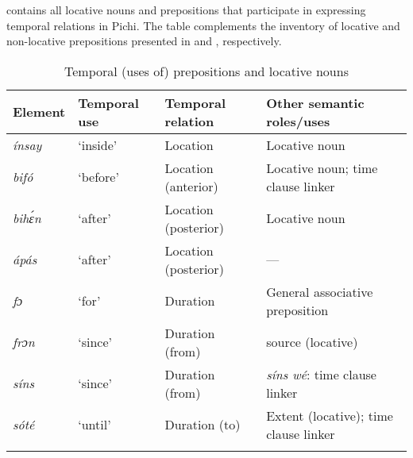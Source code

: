  contains all locative nouns and prepositions that participate in expressing temporal relations in Pichi. The table complements the inventory of locative and non-locative prepositions presented in  and , respectively.

\begin{table}
\caption{Temporal (uses of) prepositions and locative nouns}
\label{tab:key:8.7}

\begin{tabularx}{\textwidth}{lllQ}
\lsptoprule

Element & Temporal use & Temporal relation & Other semantic roles/uses\\
\midrule
\itshape ínsay & ‘inside’ & Location & Locative noun\\
\itshape bifó & ‘before’ & Location (anterior) & Locative noun; time clause linker\\
\itshape bihɛ́n & ‘after’ & Location (posterior) & Locative noun\\
\itshape ápás & ‘after’ & Location (posterior) & {}---\\
\itshape fɔ & ‘for’ & Duration & General associative preposition\\
\itshape frɔn & ‘since’ & Duration (from) & source (locative)\\
\itshape síns & ‘since’ & Duration (from) & \textit{síns wé}: time clause linker\\
\itshape sóté & ‘until’ & Duration (to) & Extent (locative); time clause linker\\
\lspbottomrule
\end{tabularx}
\end{table}
